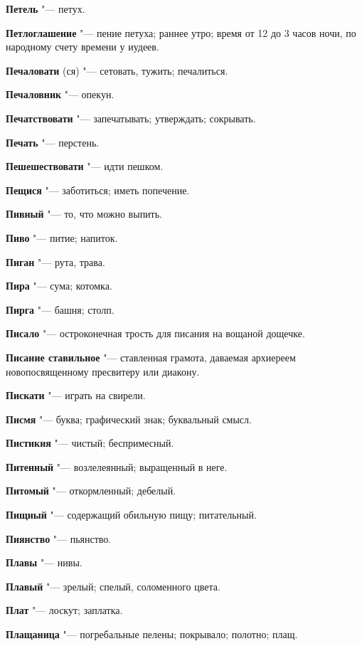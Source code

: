 \begin{mymulticols}
\noindent\textbf{Петель} "--- петух. 

\noindent\textbf{Петлоглашение} "--- пение петуха; раннее утро; время от 12 до 3 часов ночи, по народному счету времени у иудеев. 

\noindent\textbf{Печаловати} (ся) "--- сетовать, тужить; печалиться. 

\noindent\textbf{Печаловник} "--- опекун. 

\noindent\textbf{Печатствовати} "--- запечатывать; утверждать; сокрывать. 

\noindent\textbf{Печать} "--- перстень. 

\noindent\textbf{Пешешествовати} "--- идти пешком. 

\noindent\textbf{Пещися} "--- заботиться; иметь попечение. 

\noindent\textbf{Пивный} "--- то, что можно выпить. 

\noindent\textbf{Пиво} "--- питие; напиток. 

\noindent\textbf{Пиган} "--- рута, трава. 

\noindent\textbf{Пира} "--- сума; котомка. 

\noindent\textbf{Пирга} "--- башня; столп. 

\noindent\textbf{Писало} "--- остроконечная трость для писания на вощаной дощечке. 

\noindent\textbf{Писание ставильное} "--- ставленная грамота, даваемая архиереем новопосвященному пресвитеру или диакону. 

\noindent\textbf{Пискати} "--- играть на свирели. 

\noindent\textbf{Писмя} "--- буква; графический знак; буквальный смысл. 

\noindent\textbf{Пистикия} "--- чистый; беспримесный. 

\noindent\textbf{Питенный} "--- возлелеянный; выращенный в неге. 

\noindent\textbf{Питомый} "--- откормленный; дебелый. 

\noindent\textbf{Пищный} "--- содержащий обильную пищу; питательный. 

\noindent\textbf{Пиянство} "--- пьянство. 

\noindent\textbf{Плавы} "--- нивы. 

\noindent\textbf{Плавый} "--- зрелый; спелый, соломенного цвета. 

\noindent\textbf{Плат} "--- лоскут; заплатка. 

\noindent\textbf{Плащаница} "--- погребальные пелены; покрывало; полотно; плащ. 


\end{mymulticols}
